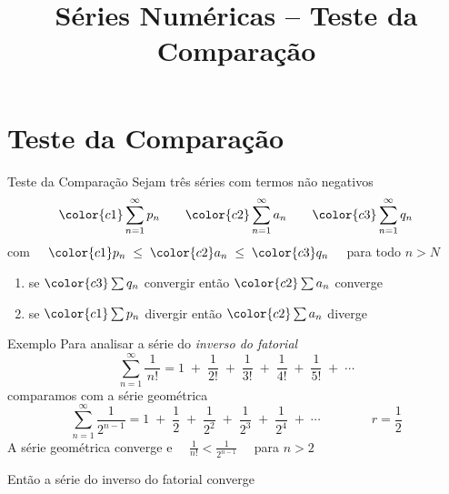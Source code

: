 \documentclass[fleqn,utf8,aspectratio=169,12pt]{beamer}
\title{Séries Numéricas -- Teste da Comparação}
\begin{document}
\addtitle

\section{Teste da Comparação}

\begin{frame}{Teste da Comparação}
  Sejam três séries com termos não negativos
  \[
    {\color{c1} \sum_{n=1}^{\infty} p_n} \qquad
    {\color{c2} \sum_{n=1}^{\infty} a_n} \qquad
    {\color{c3} \sum_{n=1}^{\infty} q_n}
  \]
  com \( \quad {\color{c1}p_n} \;\leq\; {\color{c2}a_n} \;\leq\; {\color{c3}q_n} \quad \) para todo $n>N$

  \pause
  \bigskip
  \begin{enumerate}
    \item se \tabto{8mm} \(\color{c3} \sum q_n \) convergir \tabto{40mm} então  \(\color{c2} \sum a_n \) converge \\[6mm]\pause
    \item se \tabto{8mm} \(\color{c1} \sum p_n \) divergir  \tabto{40mm} então  \(\color{c2} \sum a_n \) diverge
  \end{enumerate}
\end{frame}

\addtocounter{exemplo}{1}
\begin{frame}{Exemplo \theexemplo}
  Para analisar a série do \emph{inverso do fatorial}
  \[
    \sum_{n=1}^{\infty} \frac{1}{\,n!\,}
    = 1             \;+\;
      \frac{1}{2!}  \;+\;
      \frac{1}{3!}  \;+\;
      \frac{1}{4!}  \;+\;
      \frac{1}{5!}  \;+\;
      \cdots
  \]
  \pause
  comparamos com a série geométrica
  \[ \sum_{n=1}^{\infty} \frac{1}{2^{n-1}}
    = 1              \;+\;
      \frac{1}{2}    \;+\;
      \frac{1}{2^2}  \;+\;
      \frac{1}{2^3}  \;+\;
      \frac{1}{2^4}  \;+\;
      \cdots
      \qquad
      \qquad
      r=\frac{1}{2}
  \]
  \pause
  A série geométrica converge
  \pause
  e
  \(\quad \frac{1}{n!} < \frac{1}{2^{n-1}}\quad\)
  para $n>2$

  \pause
  \bigskip
  Então a série do inverso do fatorial converge
\end{frame}
\end{document}
